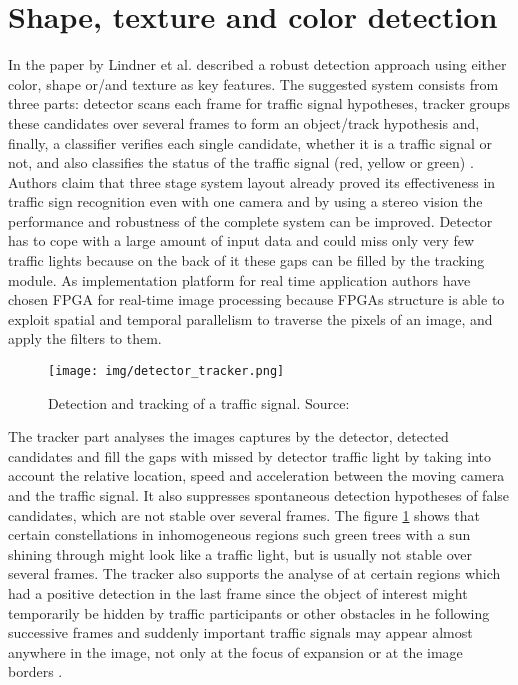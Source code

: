 \documentclass[letterpaper, 10 pt, conference]{ieeeconf} %
\begin{document}

\section{Shape, texture and color detection}
 
In the paper by Lindner et al. described a robust detection approach using either color, shape or/and texture as key features. The suggested system consists from three parts: detector scans each frame for traffic signal hypotheses, tracker groups these candidates over several frames to form an object/track hypothesis and, finally, a classifier verifies each single candidate, whether it is a traffic signal or not, and also classifies the status of the traffic signal (red, yellow or green) \cite{c6}. Authors claim that three stage system layout already proved its effectiveness in traffic sign recognition even with one camera and by using a stereo vision the performance and robustness of the complete system can be improved. Detector has to cope with a large amount of input data and could miss only very few traffic lights because on the back of it these gaps can be filled by the tracking module. As implementation platform for real time application authors have chosen FPGA for real-time image processing because FPGAs structure is able to exploit spatial and temporal parallelism to traverse the pixels of an image, and apply the filters to them.

\begin{figure}[thpb]
	\centering
	\texttt{[image: img/detector\_tracker.png]}
	\caption{Detection and tracking of a traffic signal. Source: \cite{c6}}
	\label{dettrack}
\end{figure}

The tracker part analyses the images captures by the detector, detected candidates and fill the gaps with missed by detector traffic light by taking into account the relative location, speed and acceleration between the moving camera and the traffic signal. It also suppresses spontaneous detection hypotheses of false candidates, which are not stable over several frames. The figure \ref{dettrack} shows that certain constellations in inhomogeneous regions such green trees with a sun shining through might look like a traffic light, but is usually not stable over several frames. The tracker also supports the analyse of at certain regions which had a positive detection in the last frame since the object of interest might temporarily be hidden by traffic participants or other obstacles in he following successive frames and suddenly important traffic signals may appear almost anywhere in the image, not only at the focus of expansion or at the image borders \cite{c6}.
\end{document}
